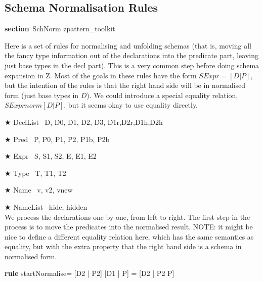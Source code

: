 \documentclass{article}
\newenvironment{zsection}{\begin{zed}}{\end{zed}}
\newcommand{\SECTION}{\textbf{section}~}
\newcommand{\parents}{\mathrel{\textbf{parents}}}
\newenvironment{zedrule}[1]{\par\textbf{rule }#1\vspace{-2ex}\infrule}{\endinfrule}
\newcommand{\derives}{\derive{}}
\newenvironment{zedjoker}[1]{\par$\bigstar$ #1\ }{}
\begin{document}
\subsection{Schema Normalisation Rules}

\begin{zsection}
  \SECTION SchNorm \parents zpattern\_toolkit
\end{zsection}

Here is a set of rules for normalising and unfolding schemas
(that is, moving all the fancy type information out of the
declarations into the predicate part, leaving just base types
in the decl part).   This is a very common step before doing
schema expansion in Z.  Most of the goals in these rules
have the form $SExpr = [D|P]$, but the intention of the rules
is that the right hand side will be in normalised form
(just base types in $D$).  We could introduce a special
equality relation, $SExpr \mathrel{norm} [D|P]$, but it seems
okay to use equality directly.

\begin{zedjoker}{DeclList} D, D0, D1, D2, D3, D1r,D2r,D1h,D2h\end{zedjoker} \\
\begin{zedjoker}{Pred} P, P0, P1, P2, P1b, P2b \end{zedjoker} \\
\begin{zedjoker}{Expr} S, S1, S2, E, E1, E2 \end{zedjoker} \\
\begin{zedjoker}{Type} T, T1, T2 \end{zedjoker} \\
\begin{zedjoker}{Name} v, v2, vnew \end{zedjoker} \\
\begin{zedjoker}{NameList} hide, hidden \end{zedjoker} \\

We process the declarations one by one, from left to right.
The first step in the process is to move the predicates into
the normalised result.    NOTE: it might be nice to define
a different equality relation here, which has the same semantics
as equality, but with the extra property that the right hand side
is a schema in normalised form.
\begin{zedrule}{startNormalise}
   [D1 | true] = [D2 | P2]
\derives
   [D1 | P] = [D2 | P2 \land P]
\end{zedrule}
\end{document}
